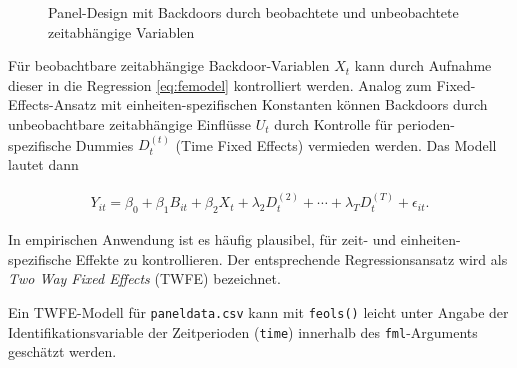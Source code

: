\documentclass[
  a4paper,
  DIV=11,
  oneside]{scrreprt}
\begin{document}
\begin{figure}[t]


\caption{\label{fig-FEDAG3}Panel-Design mit Backdoors durch beobachtete
und unbeobachtete zeitabhängige Variablen}

\end{figure}%

Für beobachtbare zeitabhängige Backdoor-Variablen \(X_t\) kann durch
Aufnahme dieser in die Regression \eqref{eq:femodel} kontrolliert
werden. Analog zum Fixed-Effects-Ansatz mit einheiten-spezifischen
Konstanten können Backdoors durch unbeobachtbare zeitabhängige Einflüsse
\(U_t\) durch Kontrolle für perioden-spezifische Dummies \(D_t^{(t)}\)
(Time Fixed Effects) vermieden werden. Das Modell lautet dann

\begin{align*}
  Y_{it} = \beta_0 + \beta_1 B_{it} + \beta_2 X_t + \lambda_2 D_t^{(2)} + \cdots + \lambda_T D_t^{(T)} + \epsilon_{it}. 
\end{align*}

In empirischen Anwendung ist es häufig plausibel, für zeit- und
einheiten-spezifische Effekte zu kontrollieren. Der entsprechende
Regressionsansatz wird als \emph{Two Way Fixed Effects} (TWFE)
bezeichnet.

Ein TWFE-Modell für \texttt{paneldata.csv} kann mit \texttt{feols()}
leicht unter Angabe der Identifikationsvariable der Zeitperioden
(\texttt{time}) innerhalb des \texttt{fml}-Arguments geschätzt werden.
\end{document}
